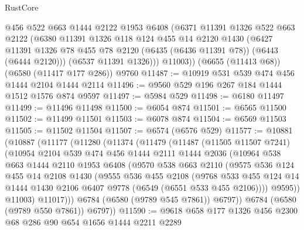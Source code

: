 \begin{lexlean}{RustCore}
\begin{coremodule}
{\begin{coremodule}
{{{{{{{{{{{{{{{{{{{{{{{{{{{{{{{{{{{{{{{{{{{{{        @456
        @522
        @663
        @1444
        @2122
        @1953
        @6408
        (@6371
          @11391
          @1326
          @522
          @663
          @2122
          (@6380
            @11391
            @1326
            @118
            @124
            @455
            @14
            @2120
            @1430
            (@6427 @11391 @1326 @78 @455 @78 @2120 (@6435 (@6436 @11391 @78)) (@6443 (@6444 @2120)))
            (@6537 @11391 @1326)))
        @11003))
    (@6655 (@11413 @68))
    (@6580 (@11417 @177 @286))
    @9760
@11487 := @10919 @531 @539 @474 @456 @1444 @2104 @1444 @2114
@11496 := @9560 @529 @196 @267 @184 @1444 @1512 @1576 @874 @9597
@11497 := @5984 @529
@11498 := @6180 @11497
@11499 := @11496 @11498
@11500 := @6054 @874
@11501 := @6565 @11500
@11502 := @11499 @11501
@11503 := @6078 @874
@11504 := @6569 @11503
@11505 := @11502 @11504
@11507 := @6574 (@6576 @529)
@11577 := @10881
    (@10887
      (@11177
        (@11280
          (@11374
            (@11479
              (@11487
                (@11505 @11507 @7241)
                (@10954
                  @2104
                  @539
                  @474
                  @456
                  @1444
                  @2111
                  @1444
                  @2036
                  (@10964
                    @538
                    @663
                    @1444
                    @2110
                    @1953
                    @6408
                    (@9570
                      @538
                      @663
                      @2110
                      (@9575
                        @536
                        @124
                        @455
                        @14
                        @2108
                        @1430
                        (@9555
                          @536
                          @455
                          @2108
                          (@9768
                            @533
                            @455
                            @124
                            @14
                            @1444
                            @1430
                            @2106
                            @6407
                            @9778
                            (@6549 (@6551 @533 @455 @2106))))
                        @9595))
                    @11003)
                  @11017)))
            @6784
            (@6580 (@9789 @545 @7861))
            @6797))
        @6784
        (@6580 (@9789 @550 @7861))
        @6797))
@11590 := @9618 @658 @177 @1326 @456 @2300 @68 @286 @90 @654 @1656 @1444 @2211 @2289
}}}}}}}}}}}}}}}}}}}}}}}}}}}}}}}}}}}}}}}}}}}}}
\end{coremodule}}
\end{coremodule}
\end{lexlean}
